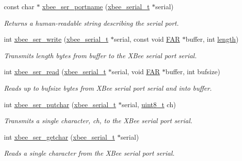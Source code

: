 \begin{DoxyCompactItemize}
const char $\ast$ \hyperlink{group__hal__posix_ga898057d1b7645785e7f3d6256828d039}{xbee\+\_\+ser\+\_\+portname} (\hyperlink{structxbee__serial__t}{xbee\+\_\+serial\+\_\+t} $\ast$serial)
\begin{DoxyCompactList}\small\item\em Returns a human-\/readable string describing the serial port. \end{DoxyCompactList}\item 
int \hyperlink{group__hal__posix_ga2ca4e60c9d642084afa52dff9e1f6be4}{xbee\+\_\+ser\+\_\+write} (\hyperlink{structxbee__serial__t}{xbee\+\_\+serial\+\_\+t} $\ast$serial, const void \hyperlink{group__hal_gaef060b3456fdcc093a7210a762d5f2ed}{F\+AR} $\ast$buffer, int \hyperlink{group__zdo_gab2b3adeb2a67e656ff030b56727fd0ac}{length})
\begin{DoxyCompactList}\small\item\em Transmits {\itshape length} bytes from {\itshape buffer} to the X\+Bee serial port {\itshape serial}. \end{DoxyCompactList}\item 
int \hyperlink{group__hal__posix_ga8263312373c03a79a718142e051b3342}{xbee\+\_\+ser\+\_\+read} (\hyperlink{structxbee__serial__t}{xbee\+\_\+serial\+\_\+t} $\ast$serial, void \hyperlink{group__hal_gaef060b3456fdcc093a7210a762d5f2ed}{F\+AR} $\ast$buffer, int bufsize)
\begin{DoxyCompactList}\small\item\em Reads up to {\itshape bufsize} bytes from X\+Bee serial port {\itshape serial} and into {\itshape buffer}. \end{DoxyCompactList}\item 
int \hyperlink{group__hal__posix_ga86fea2345efb8bf9424228f0979b1849}{xbee\+\_\+ser\+\_\+putchar} (\hyperlink{structxbee__serial__t}{xbee\+\_\+serial\+\_\+t} $\ast$serial, \hyperlink{group__hal__dos_gae1affc9ca37cfb624959c866a73f83c2}{uint8\+\_\+t} ch)
\begin{DoxyCompactList}\small\item\em Transmits a single character, {\itshape ch}, to the X\+Bee serial port {\itshape serial}. \end{DoxyCompactList}\item 
int \hyperlink{group__hal__posix_gaeeb38154313a44f86146cdcfe08e7d08}{xbee\+\_\+ser\+\_\+getchar} (\hyperlink{structxbee__serial__t}{xbee\+\_\+serial\+\_\+t} $\ast$serial)
\begin{DoxyCompactList}\small\item\em Reads a single character from the X\+Bee serial port {\itshape serial}. \end{DoxyCompactList}\item 

\end{DoxyCompactItemize}
